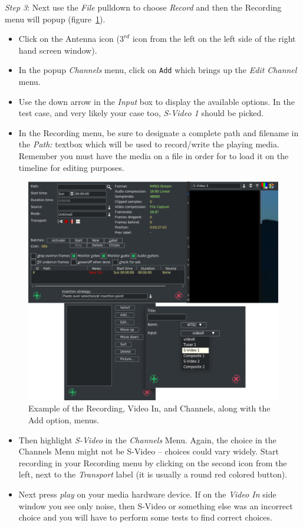 \textit{Step 3}: Next use the \textit{File} pulldown to choose \textit{Record} and then the Recording menu will popup (figure~\ref{fig:vhs01}).

\begin{itemize}
    \item Click on the Antenna icon ($3^{rd}$ icon from the left on the left side of the right hand screen window).
    \item In the popup \textit{Channels} menu, click on \texttt{Add} which brings up the \textit{Edit Channel} menu.
    \item Use the down arrow in the \textit{Input} box to display the available options.  In the test case, and very likely your case too, \textit{S-Video 1} should be picked.
    \item In the Recording menu, be sure to designate a complete path and filename in the \textit{Path:} textbox which will be used to record/write the playing media.  Remember you must have the media on a file in order for \CGG{} to load it on the timeline for editing purposes.    
\end{itemize}

\begin{figure}[htpb]
    \centering
    \includegraphics[width=0.9\linewidth]{images/vhs01.png}
    \caption{Example of the Recording, Video In, and Channels, along with the Add option, menus.}
    \label{fig:vhs01}
\end{figure}

\begin{itemize}
    \item Then highlight \textit{S-Video} in the \textit{Channels} Menu.  Again, the choice in the Channels Menu might not be S-Video -- choices could vary widely. Start recording in your Recording menu by clicking on the second icon from the left, next to the \textit{Transport} label (it is usually a round red colored button).
    \item Next press \textit{play} on your media hardware device.  If on the \textit{Video In} side window you see only noise, then S-Video or something else was an incorrect choice and you will have to perform some tests to find correct choices.
\end{itemize}

